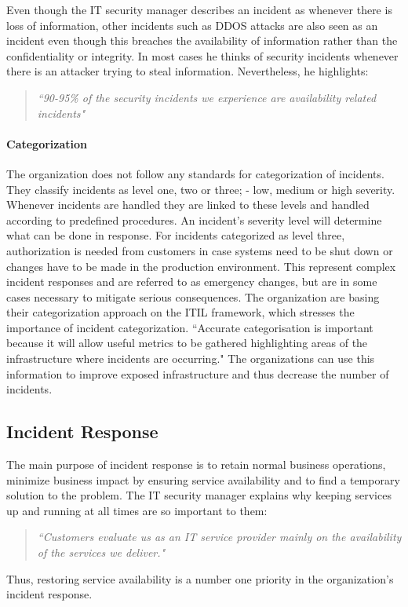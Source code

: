 Even though the IT security manager describes an incident as whenever there is loss of information, other incidents such as DDOS attacks are also seen as an incident even though this breaches the availability of information rather than the confidentiality or integrity. In most cases he thinks of security incidents whenever there is an attacker trying to steal information. Nevertheless, he highlights:
\begin{quote}
\textit{``90-95\% of the security incidents we experience are availability related incidents"}
\end{quote}

\paragraph{Categorization}
The organization does not follow any standards for categorization of incidents. They classify incidents as level one, two or three; - low, medium or high severity. Whenever incidents are handled they are linked to these levels and handled according to predefined procedures. An incident's severity level will determine what can be done in response. For incidents categorized as level three, authorization is needed from customers in case systems need to be shut down or changes have to be made in the production environment. This represent complex incident responses and are referred to as emergency changes, but are in some cases necessary to mitigate serious consequences. 
The organization are basing their categorization approach on the ITIL framework, which stresses the importance of incident categorization. ``Accurate categorisation is important because it will allow useful metrics to be gathered highlighting areas of the infrastructure where incidents are occurring\cite{itilbok}." The organizations can use this information to improve exposed infrastructure and thus decrease the number of incidents.
\subsection{Incident Response}
The main purpose of incident response is to retain normal business operations, minimize business impact by ensuring service availability and to find a temporary solution to the problem. The IT security manager explains why keeping services up and running at all times are so important to them:
\begin{quote}
\textit{``Customers evaluate us as an IT service provider mainly on the availability of the services we deliver."}
\end{quote}
Thus, restoring service availability is a number one priority in the organization's incident response.

